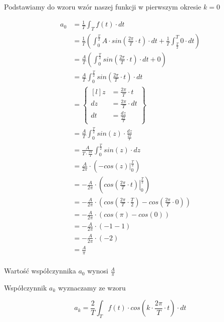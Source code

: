 \begin{task}
Podstawiamy do wzoru wzór naszej funkcji w pierwszym okresie $k=0$

\begin{align*}
a_0&=\frac{1}{T}\int_{T}f(t) \cdot dt\\
&=\frac{1}{T}\left(\int_{0}^{\frac{T}{2}}A \cdot sin\left( \frac{2\pi}{T} \cdot t\right) \cdot dt 
+ \frac{1}{T}\int_{\frac{T}{2}}^{T}0 \cdot dt \right)\\
&=\frac{A}{T}\left(\int_{0}^{\frac{T}{2}}sin\left( \frac{2\pi}{T} \cdot t\right) \cdot dt 
+ 0 \right)\\
&=\frac{A}{T}\int_{0}^{\frac{T}{2}}sin\left( \frac{2\pi}{T} \cdot t\right) \cdot dt\\
&=\begin{Bmatrix*}[l]
z&=\frac{2\pi}{T} \cdot t\\
dz&=\frac{2\pi}{T} \cdot dt\\
dt&=\frac{dz}{\frac{2\pi}{T}}
\end{Bmatrix*}\\
&=\frac{A}{T}\int_{0}^{\frac{T}{2}}sin\left( z\right) \cdot \frac{dz}{\frac{2\pi}{T}}\\
&=\frac{A}{T\cdot \frac{2\pi}{T}}\int_{0}^{\frac{T}{2}}sin\left( z\right) \cdot dz\\
&=\frac{A}{2\pi}\cdot \left(\left . -cos\left( z\right) \right|_{0}^{\frac{T}{2}}\right)\\
&=-\frac{A}{2\pi}\cdot \left(\left . cos\left( \frac{2\pi}{T} \cdot t\right) \right|_{0}^{\frac{T}{2}}\right)\\
&=-\frac{A}{2\pi}\cdot \left( cos\left( \frac{2\pi}{T} \cdot \frac{T}{2}\right) - cos\left( \frac{2\pi}{T} \cdot 0\right)\right)\\
&=-\frac{A}{2\pi}\cdot \left( cos\left( \pi\right) - cos\left( 0\right)\right)\\
&=-\frac{A}{2\pi}\cdot \left( -1 - 1\right)\\
&=-\frac{A}{2\pi}\cdot \left( -2\right)\\
&=\frac{A}{\pi}\\
\end{align*}

Wartość współczynnika $a_0$ wynosi $\frac{A}{\pi}$

Współczynnik $a_k$ wyznaczamy ze wzoru

\begin{equation}
a_k=\frac{2}{T}\int_{T}f(t) \cdot cos\left( k \cdot \frac{2\pi}{T} \cdot t\right) \cdot dt
\end{equation}


\end{task}

